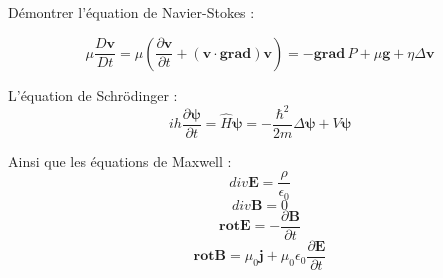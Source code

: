 Démontrer l'équation de Navier-Stokes :

\vspace{-15pt}
\begin{equation*}
    \mu \frac {D \boldsymbol {v}} {Dt}
    = \mu \left(\frac {\partial \boldsymbol {v}} {\partial t} + (\boldsymbol {v} \cdot \boldsymbol {grad}) \boldsymbol {v} \right)
    = - \boldsymbol {grad} \, P + \mu \boldsymbol {g} + \eta \Delta \boldsymbol {v}
\end{equation*}

L'équation de Schrödinger :
\begin{equation*}
    ih \frac{\partial \boldsymbol {\psi}} {\partial t}
    = \hat {H} \boldsymbol {\psi}
    = - \frac{\hbar^2}{2m} \Delta \boldsymbol {\psi} + V \boldsymbol {\psi}
\end{equation*}

Ainsi que les équations de Maxwell :
\begin{equation*}
    div \boldsymbol {E} = \frac {\rho} {\epsilon_0}
\end{equation*}
\begin{equation*}
    div \boldsymbol {B} = 0
\end{equation*}
\begin{equation*}
    \boldsymbol {rot} \boldsymbol {E} = - \frac {\partial \boldsymbol {B}} {\partial t}
\end{equation*}
\begin{equation*}
    \boldsymbol {rot} \boldsymbol {B} = \mu_0 \boldsymbol {j} + \mu_0 \epsilon_0 \frac {\partial \boldsymbol {E}} {\partial t}
\end{equation*}
